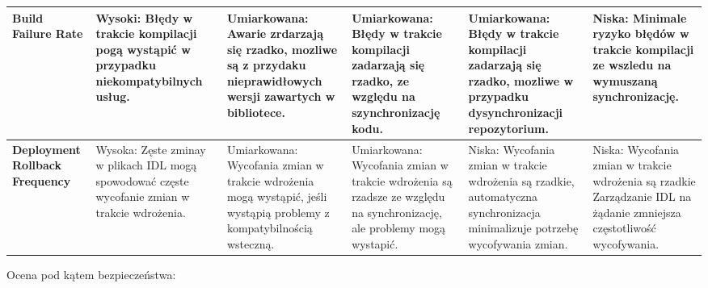 \documentclass[runningheads,12pt]{llncs}
\begin{document}
\begin{table}[htbp]
\begin{tabularx}{\textwidth}{|>{\raggedright\arraybackslash}X|>{\raggedright\arraybackslash}X|>{\raggedright\arraybackslash}X|>{\raggedright\arraybackslash}X|>{\raggedright\arraybackslash}X|>{\raggedright\arraybackslash}X|}
    \hline
    \textbf{Build Failure Rate} &
    Wysoki: Błędy w trakcie kompilacji pogą wystąpić w przypadku niekompatybilnych usług. &
    Umiarkowana: Awarie zrdarzają się rzadko, mozliwe są z przydaku nieprawidłowych wersji zawartych w bibliotece. &
    Umiarkowana: Błędy w trakcie kompilacji zadarzają się rzadko, ze względu na szynchronizację kodu. &
    Umiarkowana: Błędy w trakcie kompilacji zadarzają się rzadko, mozliwe w przypadku dysynchronizacji repozytorium. &
    Niska: Minimale ryzyko błędów w trakcie kompilacji ze wszledu na wymuszaną synchronizację. \\
    \hline
    \textbf{Deployment Rollback Frequency} &
    Wysoka: Zęste zminay w plikach IDL mogą spowodować częste wycofanie zmian w trakcie wdrożenia. &
    Umiarkowana: Wycofania zmian w trakcie wdrożenia mogą wystąpić, jeśli wystąpią problemy z kompatybilnością wsteczną. &
    Umiarkowana: Wycofania zmian w trakcie wdrożenia są rzadsze ze względu na synchronizację, ale problemy mogą wystapić. &
    Niska: Wycofania zmian w trakcie wdrożenia są rzadkie, automatyczna synchronizacja minimalizuje potrzebę wycofywania zmian. &
    Niska: Wycofania zmian w trakcie wdrożenia są rzadkie Zarządzanie IDL na żądanie zmniejsza częstotliwość wycofywania. \\
    \hline
    \end{tabularx}
\end{table}

\newpage

Ocena pod kątem bezpieczeństwa:
\end{document}
